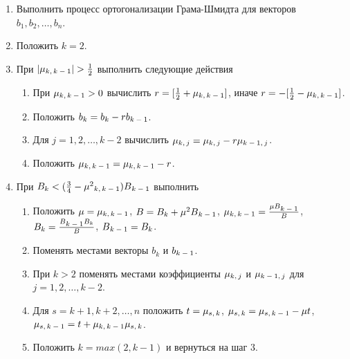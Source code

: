     \begin{enumerate}
     \item Выполнить процесс ортогонализации Грама-Шмидта для векторов  \\{$b_1, b_2, \dots, b_n$}. 
     \item Положить {$k=2$}.
     \item При {$ |\mu\textsubscript{{$k,k-1$}}| > \frac{1}{2}$} выполнить следующие действия
     
      \begin{enumerate}
       \item При {$ \mu\textsubscript{{$k,k-1$}} > 0 $} вычислить {$r=[\frac{1}{2} + \mu\textsubscript{{$k,k-1$}}]$}, иначе {$r=-[\frac{1}{2} - \mu\textsubscript{{$k,k-1$}}]$}.
       \item Положить {$b_k = b_k - r b\textsubscript{{$k-1$}}$}.
       \item Для {$j=1,2,\dots,k-2$} вычислить {$ \mu\textsubscript{{$k,j$}}=\mu\textsubscript{{$k,j$}} - r \mu\textsubscript{{$k-1,j$}} $}.
       \item Положить {$ \mu\textsubscript{{$k,k-1$}}=\mu\textsubscript{{$k,k-1$}} - r $}.
      \end{enumerate}
     
     \item При {$ B_k < (\frac{3}{4} - \mu^2\textsubscript{{$k,k-1$}})B\textsubscript{{$k-1$}} $} выполнить
     
      \begin{enumerate}
       \item Положить {$\mu = \mu\textsubscript{{$k,k-1$}}$}, {$B=B_k + \mu^2 B\textsubscript{{$k-1$}}$}, {$\mu\textsubscript{{$k,k-1$}}=\frac{\mu B\textsubscript{{$k-1$}}}{B}$},
	{$B_k = \frac{B\textsubscript{{$k-1$}} B_k}{B}$}, {$B\textsubscript{{$k-1$}} = B_k$}.
       \item Поменять местами векторы {$b_k$} и {$b\textsubscript{{$k-1$}}$}.
       \item При {$k > 2$} поменять местами коэффициенты {$\mu\textsubscript{{$k,j$}}$} и {$\mu\textsubscript{{$k-1,j$}}$} для {$j=1,2,\dots,k-2$}.
       \item Для {$s=k+1,k+2,\dots,n$} положить {$t=\mu\textsubscript{{$s,k$}}$}, {$\mu\textsubscript{{$s,k$}}=\mu\textsubscript{{$s,k-1$}}-\mu t$},
	{$\mu\textsubscript{{$s,k-1$}}=t + \mu\textsubscript{{$k,k-1$}} \mu\textsubscript{{$s,k$}}$}.
       \item Положить {$k = max(2,k-1)$} и вернуться на шаг 3.
      \end{enumerate}
     

\end{enumerate}
